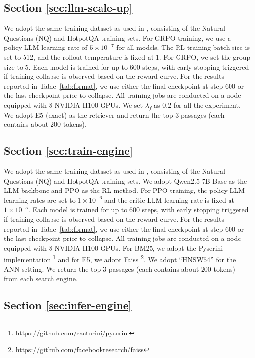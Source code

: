 \subsection{Section \ref{sec:llm-scale-up}}\label{apx:setting4}

We adopt the same training dataset as used in \cite{jin2025search}, consisting of the Natural Questions (NQ) and HotpotQA training sets.
For GRPO training, we use a policy LLM learning rate of $5 \times 10^{-7}$ for all models. The RL training batch size is set to 512, and the rollout temperature is fixed at 1. For GRPO, we set the group size to 5.
Each model is trained for up to 600 steps, with early stopping triggered if training collapse is observed based on the reward curve. For the results reported in Table~\ref{tab:format}, we use either the final checkpoint at step 600 or the last checkpoint prior to collapse.
All training jobs are conducted on a node equipped with 8 NVIDIA H100 GPUs.
We set $\lambda_f$ as 0.2 for all the experiment.
We adopt E5 (exact) as the retriever and return the top-3 passages (each contains about 200 tokens).

\subsection{Section \ref{sec:train-engine}}\label{apx:setting5}

We adopt the same training dataset as used in \cite{jin2025search}, consisting of the Natural Questions (NQ) and HotpotQA training sets.
We adopt Qwen2.5-7B-Base as the LLM backbone and PPO as the RL method.
For PPO training, the policy LLM learning rates are set to $1 \times 10^{-6}$ and the critic LLM learning rate is fixed at $1 \times 10^{-5}$.
Each model is trained for up to 600 steps, with early stopping triggered if training collapse is observed based on the reward curve. 
For the results reported in Table~\ref{tab:format}, we use either the final checkpoint at step 600 or the last checkpoint prior to collapse.
All training jobs are conducted on a node equipped with 8 NVIDIA H100 GPUs.
For BM25, we adopt the Pyserini implementation \footnote{https://github.com/castorini/pyserini} and for E5, we adopt Faiss \footnote{https://github.com/facebookresearch/faiss}.
We adopt ``HNSW64'' for the ANN setting.
We return the top-3 passages (each contains about 200 tokens) from each search engine.

\subsection{Section \ref{sec:infer-engine}}\label{apx:setting6}

